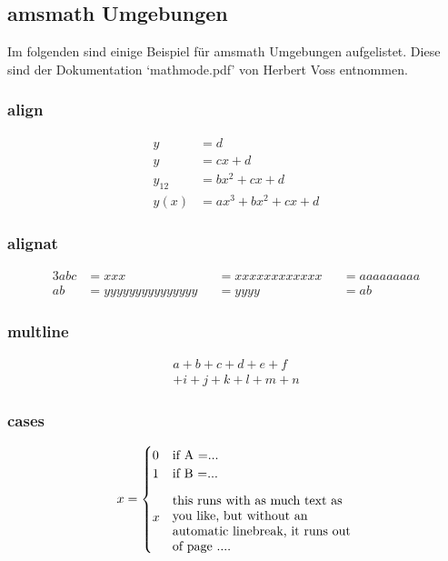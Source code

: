 \subsection{amsmath Umgebungen}

Im folgenden sind einige Beispiel für amsmath Umgebungen aufgelistet. Diese sind der Dokumentation `mathmode.pdf' von Herbert Voss entnommen.

\subsubsection{align}
\begin{align}
y      & = d\\
y      & = cx + d\\
y_{12} & = bx^{2} + cx + d\\
y(x)   & = ax^{3} + bx^{2}+ cx + d
\end{align}

\subsubsection{alignat}
\begin{alignat}{3}
abc   &= xxx &&= xxxxxxxxxxxx &&= aaaaaaaaa \\
ab    &= yyyyyyyyyyyyyyy &&= yyyy &&= ab
\end{alignat}

\subsubsection{multline}

\begin{multline}
a+b+c+d+e+f\\
+i+j+k+l+m+n
\end{multline}

\subsubsection{cases}
\begin{equation}
x = \begin{cases}
   0 & \text{if A =...}\\
   1 & \text{if B =...}\\
   x & \parbox{5 cm}{%
\flushleft %
this runs with as much text as you like,
but without an automatic linebreak,
it runs out of page ....} %
\end{cases}
\end{equation}

